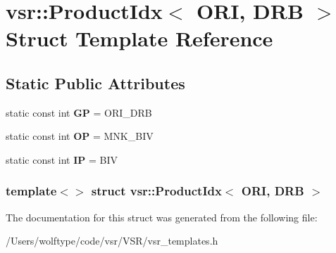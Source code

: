 \hypertarget{structvsr_1_1_product_idx_3_01_o_r_i_00_01_d_r_b_01_4}{\section{vsr\-:\-:Product\-Idx$<$ O\-R\-I, D\-R\-B $>$ Struct Template Reference}
\label{structvsr_1_1_product_idx_3_01_o_r_i_00_01_d_r_b_01_4}
}
\subsection*{Static Public Attributes}
\begin{DoxyCompactItemize}
\item 
\hypertarget{structvsr_1_1_product_idx_3_01_o_r_i_00_01_d_r_b_01_4_a98e07b6feee0f353ae5efaa405ead52e}{static const int {\bfseries G\-P} = O\-R\-I\-\_\-\-D\-R\-B}\label{structvsr_1_1_product_idx_3_01_o_r_i_00_01_d_r_b_01_4_a98e07b6feee0f353ae5efaa405ead52e}

\item 
\hypertarget{structvsr_1_1_product_idx_3_01_o_r_i_00_01_d_r_b_01_4_a0daa1aa2eb3941d1ae290338396aec03}{static const int {\bfseries O\-P} = M\-N\-K\-\_\-\-B\-I\-V}\label{structvsr_1_1_product_idx_3_01_o_r_i_00_01_d_r_b_01_4_a0daa1aa2eb3941d1ae290338396aec03}

\item 
\hypertarget{structvsr_1_1_product_idx_3_01_o_r_i_00_01_d_r_b_01_4_a383efdbe31ad62172bd225f1e996d27f}{static const int {\bfseries I\-P} = B\-I\-V}\label{structvsr_1_1_product_idx_3_01_o_r_i_00_01_d_r_b_01_4_a383efdbe31ad62172bd225f1e996d27f}

\end{DoxyCompactItemize}
\subsubsection*{template$<$$>$ struct vsr\-::\-Product\-Idx$<$ O\-R\-I, D\-R\-B $>$}



The documentation for this struct was generated from the following file\-:\begin{DoxyCompactItemize}
\item 
/\-Users/wolftype/code/vsr/\-V\-S\-R/vsr\-\_\-templates.\-h\end{DoxyCompactItemize}
